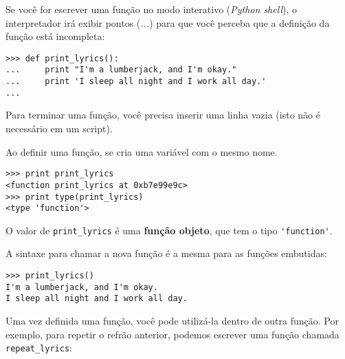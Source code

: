 

Se você for escrever uma função no modo interativo ({\it Python shell}), o
interpretador irá exibir pontos (\emph{...}) para que você perceba que a
definição da função está incompleta:

\beforeverb
\begin{verbatim}
>>> def print_lyrics():
...     print "I'm a lumberjack, and I'm okay."
...     print 'I sleep all night and I work all day.'
...
\end{verbatim}
\afterverb
%

%
Para terminar uma função, você precisa inserir uma linha vazia (isto não é
necessário em um script).


Ao definir uma função, se cria uma variável com o mesmo nome.

\beforeverb
\begin{verbatim}
>>> print print_lyrics
<function print_lyrics at 0xb7e99e9c>
>>> print type(print_lyrics)
<type 'function'>
\end{verbatim}
\afterverb
%

%
O valor de \verb"print_lyrics" é uma {\bf função objeto}, que tem o tipo
\verb"'function'".



A sintaxe para chamar a nova função é a mesma para as funções
embutidas:

\beforeverb
\begin{verbatim}
>>> print_lyrics()
I'm a lumberjack, and I'm okay.
I sleep all night and I work all day.
\end{verbatim}
\afterverb
%

%
Uma vez definida uma função, você pode utilizá-la dentro de outra função.
Por exemplo, para repetir o refrão anterior, podemos escrever uma função
chamada \verb"repeat_lyrics":

